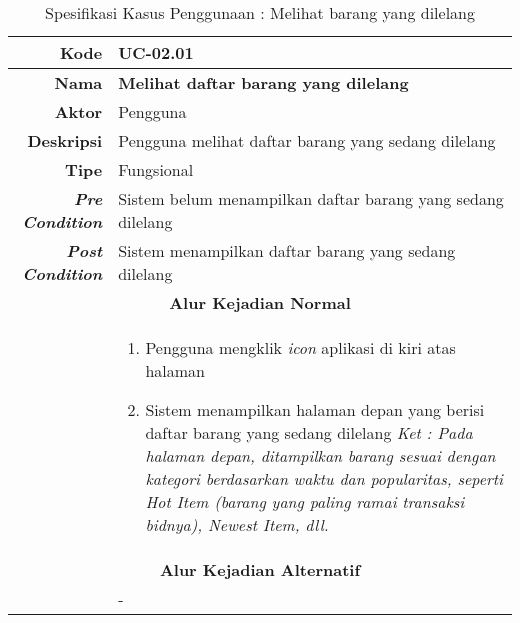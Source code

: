 
\begin{table}[H]
	\centering
	\caption{Spesifikasi Kasus Penggunaan : Melihat barang yang dilelang}
	\label{uc02.01}
	\begin{tabular}{|r|p{8cm}|}
		\hline
		\textbf{Kode}                                                    & UC-02.01                                                     \\ \hline
		\textbf{Nama}                                                    
			& \textbf{Melihat daftar barang yang dilelang}                                         
			\\ \hline
		\textbf{Aktor}                                                   & Pengguna                                                    \\ \hline
		\textbf{Deskripsi}
			& Pengguna melihat daftar barang yang sedang dilelang
			\\ \hline
		\textbf{Tipe}                                                    
			& Fungsional
			\\ \hline
		\textbf{\textit{Pre Condition}}
			& Sistem belum menampilkan daftar barang yang sedang dilelang
			\\ \hline
		\textbf{\textit{Post Condition}}
			& Sistem menampilkan daftar barang yang sedang dilelang
			\\ \hline
		\multicolumn{2}{|c|}{\textbf{Alur Kejadian Normal}}                                                                            \\ \hline
		\multicolumn{1}{|l|}{}                                           & 
		\begin{enumerate}
			\item Pengguna mengklik \textit{icon} aplikasi di kiri atas halaman
			\item Sistem menampilkan halaman depan yang berisi daftar barang yang sedang dilelang
				  \newline
				  \textit{Ket : Pada halaman depan, ditampilkan barang sesuai dengan kategori berdasarkan waktu dan popularitas, seperti Hot Item (barang yang paling ramai transaksi bidnya), Newest Item, dll.}
		\end{enumerate}
		\\ \hline
		\multicolumn{2}{|c|}{\textbf{Alur Kejadian Alternatif}}                                                         \\ \hline
		\multicolumn{1}{|l|}{}                                           
			& -
		\\ \hline
	\end{tabular}
\end{table}